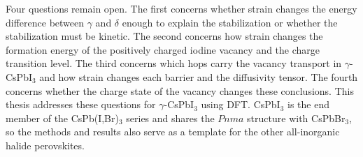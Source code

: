 Four questions remain open. The first concerns whether strain changes the energy difference between $\gamma$ and $\delta$ enough to explain the stabilization or whether the stabilization must be kinetic. The second concerns how strain changes the formation energy of the positively charged iodine vacancy and the charge transition level. The third concerns which hops carry the vacancy transport in $\gamma$-CsPbI$_3$ and how strain changes each barrier and the diffusivity tensor. The fourth concerns whether the charge state of the vacancy changes these conclusions. This thesis addresses these questions for $\gamma$-CsPbI$_3$ using DFT. CsPbI$_3$ is the end member of the CsPb(I,Br)$_3$ series and shares the $Pnma$ structure with CsPbBr$_3$, so the methods and results also serve as a template for the other all-inorganic halide perovskites.

